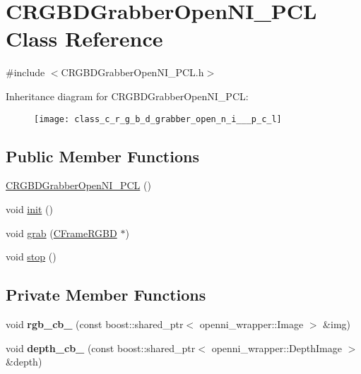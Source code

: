 \hypertarget{class_c_r_g_b_d_grabber_open_n_i___p_c_l}{
\section{CRGBDGrabberOpenNI\_\-PCL Class Reference}
\label{class_c_r_g_b_d_grabber_open_n_i___p_c_l}
}


{\ttfamily \#include $<$CRGBDGrabberOpenNI\_\-PCL.h$>$}

Inheritance diagram for CRGBDGrabberOpenNI\_\-PCL:\begin{figure}[H]
\begin{center}
\leavevmode
\texttt{[image: class\_c\_r\_g\_b\_d\_grabber\_open\_n\_i\_\_\_p\_c\_l]}
\end{center}
\end{figure}
\subsection*{Public Member Functions}
\begin{DoxyCompactItemize}
\item 
\hyperlink{class_c_r_g_b_d_grabber_open_n_i___p_c_l_a74e58381667d17469ed2538942ae4642}{CRGBDGrabberOpenNI\_\-PCL} ()
\item 
void \hyperlink{class_c_r_g_b_d_grabber_open_n_i___p_c_l_abffd24f81fc9d0668ade3fae4a610a5b}{init} ()
\item 
void \hyperlink{class_c_r_g_b_d_grabber_open_n_i___p_c_l_ab01be725fe3388898a9bad48aa6e15bb}{grab} (\hyperlink{class_c_frame_r_g_b_d}{CFrameRGBD} $\ast$)
\item 
void \hyperlink{class_c_r_g_b_d_grabber_open_n_i___p_c_l_a7ed8695258084e50b76241fe8543f527}{stop} ()
\end{DoxyCompactItemize}
\subsection*{Private Member Functions}
\begin{DoxyCompactItemize}
\item 
\hypertarget{class_c_r_g_b_d_grabber_open_n_i___p_c_l_ac3f9cbbb50f43bb162a981226e5c86d5}{
void {\bfseries rgb\_\-cb\_\-} (const boost::shared\_\-ptr$<$ openni\_\-wrapper::Image $>$ \&img)}
\label{class_c_r_g_b_d_grabber_open_n_i___p_c_l_ac3f9cbbb50f43bb162a981226e5c86d5}

\item 
\hypertarget{class_c_r_g_b_d_grabber_open_n_i___p_c_l_ac6bdc65fa81bd86e7f22d3f8b70da079}{
void {\bfseries depth\_\-cb\_\-} (const boost::shared\_\-ptr$<$ openni\_\-wrapper::DepthImage $>$ \&depth)}
\label{class_c_r_g_b_d_grabber_open_n_i___p_c_l_ac6bdc65fa81bd86e7f22d3f8b70da079}

\end{DoxyCompactItemize}
